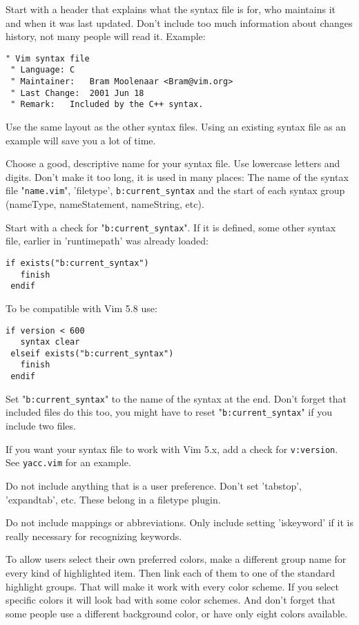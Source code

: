 Start with a header that explains what the syntax file is for, who maintains it and when it was last updated.
Don't include too much information about changes history, not many people will read it.
Example:

\begin{Verbatim}[samepage=true]
 " Vim syntax file
 " Language: C
 " Maintainer:   Bram Moolenaar <Bram@vim.org>
 " Last Change:  2001 Jun 18
 " Remark:   Included by the C++ syntax.
\end{Verbatim}

Use the same layout as the other syntax files.
Using an existing syntax file as an example will save you a lot of time.

Choose a good, descriptive name for your syntax file.
Use lowercase letters and digits.
Don't make it too long, it is used in many places: The name of the syntax file "\verb!name.vim!", 'filetype', \verb!b:current_syntax! and the start of each syntax group (nameType, nameStatement, nameString, etc).

Start with a check for "\verb!b:current_syntax!".
If it is defined, some other syntax file, earlier in 'runtimepath' was already loaded:

\begin{Verbatim}[samepage=true]
 if exists("b:current_syntax")
   finish
 endif
\end{Verbatim}

To be compatible with Vim 5.8 use:

\begin{Verbatim}[samepage=true]
 if version < 600
   syntax clear
 elseif exists("b:current_syntax")
   finish
 endif
\end{Verbatim}

Set "\verb!b:current_syntax!" to the name of the syntax at the end.
Don't forget that included files do this too, you might have to reset "\verb!b:current_syntax!" if you include two files.

If you want your syntax file to work with Vim 5.x, add a check for \verb!v:version!.
See \verb!yacc.vim! for an example.

Do not include anything that is a user preference.
Don't set 'tabstop', 'expandtab', etc.
These belong in a filetype plugin.

Do not include mappings or abbreviations.
Only include setting 'iskeyword' if it is really necessary for recognizing keywords.

To allow users select their own preferred colors, make a different group name for every kind of highlighted item.
Then link each of them to one of the standard highlight groups.
That will make it work with every color scheme.
If you select specific colors it will look bad with some color schemes.
And don't forget that some people use a different background color, or have only eight colors available.

